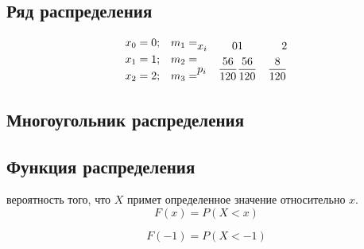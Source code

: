     \subsection{Ряд распределения}
        \begin{equation}
            \begin{align*}
                &x_{0} = 0 ; &m_{1} = \\
                &x_{1} = 1 ; &m_{2} = \\
                &x_{2} = 2 ; &m_{3} = \\
            \end{align*}

            \begin{align*}
                &x_{i} &0 &1 &2\\
                &p_{i} &\frac{56}{120} &\frac{56}{120} &\frac{8}{120}
            \end{align*}

            \begin{tabular}{|c|c|c|}
                
            \end{tabular}
        \end{equation}

    \subsection{Многоугольник распределения}

    \subsection{Функция распределения}    
        вероятность того, что \(X\) примет определенное значение относительно \(x\).
        \begin{equation}
            F(x) = P(X < x)
        \end{equation}
        \begin{ex}
            \begin{equation}
                F(-1) = P(X < -1)
            \end{equation}
        \end{ex}

